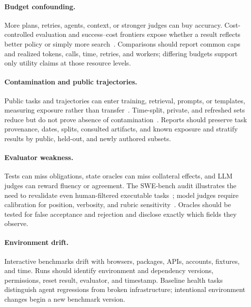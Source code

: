 \paragraph{Budget confounding.}
More plans, retries, agents, context, or stronger judges can buy accuracy. Cost-controlled evaluation and success--cost frontiers expose whether a result reflects better policy or simply more search~\cite{kapoor2025agentsmatter}. Comparisons should report common caps and realized tokens, calls, time, retries, and workers; differing budgets support only utility claims at those resource levels.

\paragraph{Contamination and public trajectories.}
Public tasks and trajectories can enter training, retrieval, prompts, or templates, measuring exposure rather than transfer~\cite{kapoor2025agentsmatter}. Time-split, private, and refreshed sets reduce but do not prove absence of contamination~\cite{chen2025contamination}. Reports should preserve task provenance, dates, splits, consulted artifacts, and known exposure and stratify results by public, held-out, and newly authored subsets.

\paragraph{Evaluator weakness.}
Tests can miss obligations, state oracles can miss collateral effects, and LLM judges can reward fluency or agreement. The SWE-bench audit illustrates the need to revalidate even human-filtered executable tasks~\cite{openai2026swebenchaudit}; model judges require calibration for position, verbosity, and rubric sensitivity~\cite{liu2023geval,zheng2023llmjudge}. Oracles should be tested for false acceptance and rejection and disclose exactly which fields they observe.

\paragraph{Environment drift.}
Interactive benchmarks drift with browsers, packages, APIs, accounts, fixtures, and time. Runs should identify environment and dependency versions, permissions, reset result, evaluator, and timestamp. Baseline health tasks distinguish agent regressions from broken infrastructure; intentional environment changes begin a new benchmark version.


